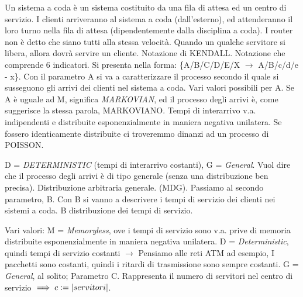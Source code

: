 \begin{center}
\end{center}

Un sistema a coda è un sistema costituito da una fila di attesa ed un centro di servizio. I clienti arriveranno al sistema a coda (dall'esterno), ed attenderanno il loro turno nella fila di attesa (dipendentemente dalla disciplina a coda). I router non è detto che siano tutti alla stessa velocità. Quando un qualche servitore si libera, allora dovrà servire un cliente. Notazione di KENDALL. Notazione che comprende 6 indicatori. Si presenta nella forma:
\{A/B/C/D/E/X $\rightarrow$ A/B/c/d/e - x\}. Con il parametro A si va a caratterizzare il processo secondo il quale si susseguono gli arrivi dei clienti nel sistema a coda. Vari valori possibili per A. Se A è uguale ad M, significa \textit{MARKOVIAN}, ed il processo degli arrivi è, come suggerisce la stessa parola, MARKOVIANO. Tempi di interarrivo v.a. indipendenti e distribuite esponenzialmente in maniera negativa unilatera. Se fossero identicamente distribuite ci troveremmo dinanzi ad un processo di POISSON.

D = \textit{DETERMINISTIC} (tempi di interarrivo costanti), G = \textit{General}. Vuol dire che il processo degli arrivi è di tipo generale (senza una distribuzione ben precisa). Distribuzione arbitraria generale. (MDG). Passiamo al secondo parametro, B. Con B si vanno a descrivere i tempi di servizio dei clienti nei sistemi a coda. B distribuzione dei tempi di servizio.

Vari valori: M = \textit{Memoryless}, ove i tempi di servizio sono v.a. prive di memoria distribuite esponenzialmente in maniera negativa unilatera. D = \textit{Deterministic}, quindi tempi di servizio costanti $\rightarrow$ Pensiamo alle reti ATM ad esempio, I pacchetti sono costanti, quindi i ritardi di trasmissione sono sempre costanti. G = \textit{General}, al solito; Parametro C. Rappresenta il numero di servitori nel centro di servizio $\implies c := \left\vert{servitori}\right\vert$.

